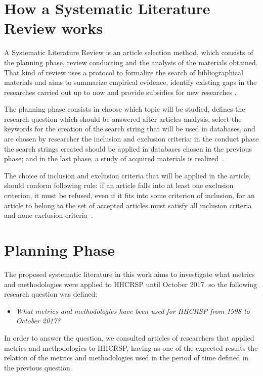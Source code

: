 
\section{How a Systematic Literature Review works}

A Systematic Literature Review is an article selection method, which consists of the planning phase, review conducting and the analysis of the materials obtained. That kind of review uses a  protocol to formalize the search of bibliographical materials and aims to summarize empirical evidence, identify existing gaps in the researches carried out up to now and provide subsidies for new researches .

The planning phase consists in choose which topic will be studied, defines the research question which should be answered after articles analysis, select the keywords for the creation of the search string that will be used in databases, and are chosen by researcher the inclusion and exclusion criteria; in the conduct phase the search strings created should be applied in databases chosen in the previous phase; and in the last phase, a study of acquired materials is realized~. 

The choice of inclusion and exclusion criteria that will be applied in the article, should conform  following rule: if an article falls into at least one exclusion criterion, it must be refused, even if it fits into some criterion of inclusion, for an article to belong to the set of accepted articles must satisfy all inclusion criteria and none exclusion criteria~.

\section{Planning Phase}

The proposed systematic literature in this work aims to investigate what metrics and methodologies were applied to \ac{HHCRSP} until October 2017. so the following research question was defined:

\begin{itemize}
\item \emph{What metrics and methodologies have been used for \ac{HHCRSP} from 1998 to October 2017?}
\end{itemize}

In order to answer the question, we consulted articles of researchers that applied metrics and methodologies to \ac{HHCRSP}, having as one of the expected results the relation of the metrics and methodologies used in the period of time defined in the previous question.

